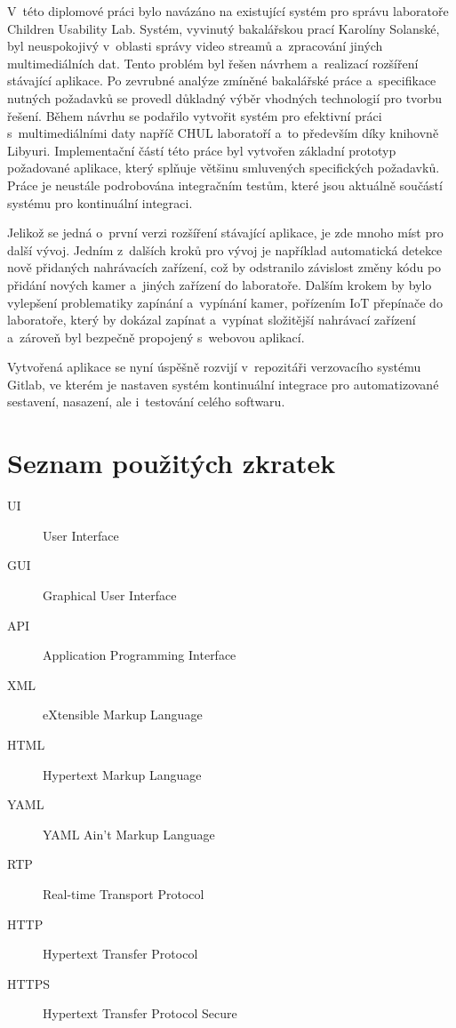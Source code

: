 \documentclass[thesis=M,czech]{FITthesis}[2012/06/26]
\begin{document}
	
\begin{conclusion}
V~této diplomové práci bylo navázáno na existující systém pro správu laboratoře Children Usability Lab. Systém, vyvinutý bakalářskou prací Karolíny Solanské, byl neuspokojivý v~oblasti správy video streamů a~zpracování jiných multimediálních dat. Tento problém byl řešen návrhem a~realizací rozšíření stávající aplikace. Po zevrubné analýze zmíněné bakalářské práce a~specifikace nutných požadavků se provedl důkladný výběr vhodných technologií pro tvorbu řešení. Během návrhu se podařilo vytvořit systém pro efektivní práci s~multimediálními daty napříč CHUL laboratoří a~to především díky knihovně Libyuri. Implementační částí této práce byl vytvořen základní prototyp požadované aplikace, který splňuje většinu smluvených specifických požadavků. Práce je neustále podrobována integračním testům, které jsou aktuálně součástí systému pro kontinuální integraci.

	Jelikož se jedná o~první verzi rozšíření stávající aplikace, je zde mnoho míst pro další vývoj. Jedním z~dalších kroků pro vývoj je například automatická detekce nově přidaných nahrávacích zařízení, což by odstranilo závislost změny kódu po přidání nových kamer a~jiných zařízení do laboratoře. Dalším krokem by bylo vylepšení problematiky zapínání a~vypínání kamer, pořízením IoT přepínače do laboratoře, který by dokázal zapínat a~vypínat složitější nahrávací zařízení a~zároveň byl bezpečně propojený s~webovou aplikací.
	
	Vytvořená aplikace se nyní úspěšně rozvijí v~repozitáři verzovacího systému Gitlab, ve kterém je nastaven systém kontinuální integrace pro automatizované sestavení, nasazení, ale i~testování celého softwaru.
\end{conclusion}

\nocite{*}



\appendix

\chapter{Seznam použitých zkratek}
\begin{description}
	\item[UI] User Interface
	\item[GUI] Graphical User Interface
	\item[API] Application Programming Interface
	\item[XML] eXtensible Markup Language
	\item[HTML] Hypertext Markup Language
	\item[YAML] YAML Ain't Markup Language
	\item[RTP] Real-time Transport Protocol
	\item[HTTP] Hypertext Transfer Protocol
	\item[HTTPS] Hypertext Transfer Protocol Secure
\end{description}
\end{document}
